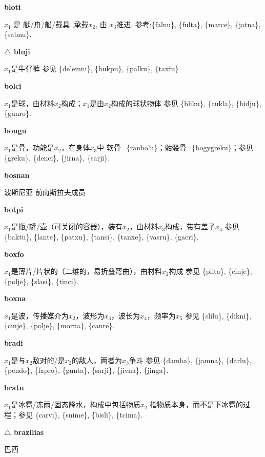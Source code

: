 \documentclass[notitlepage,twocolumn,a4paper,10pt]{book}
\begin{document}
{\sffamily\bfseries bloti}  $x_1$ 是 艇\slash{}舟\slash{}船\slash{}载具 ,承载$x_2$, 由 $x_3$推进. \textemdash{} 参考:\{falnu\}, \{fulta\}, \{marce\}, \{jatna\}, \{sabnu\}.

{\sffamily\bfseries $\triangle$ bluji} $x_1$是牛仔裤 \textemdash{} 参见 \{de'emni\}, \{bukpu\}, \{palku\}, \{taxfu\}

{\sffamily\bfseries bolci}  $x_1$是球，由材料$x_2$构成；$x_1$是由$x_2$构成的球状物体 \textemdash{} 参见 \{bliku\}, \{cukla\}, \{bidju\}, \{gunro\}.

{\sffamily\bfseries bongu}\enspace {\ttfamily\bfseries[bog     bo'u]}  $x_1$是骨，功能是$x_2$，在身体$x_3$中 \textemdash{} 软骨=\{ranbo'u\}；骷髅骨=\{bogygreku\}；参见\{greku\}, \{denci\}, \{jirna\}, \{sarji\}.

{\sffamily\bfseries bosnan} 波斯尼亚 \textemdash{} 前南斯拉夫成员

{\sffamily\bfseries botpi}\enspace {\ttfamily\bfseries[bot     bo'i]}  $x_1$是瓶\slash{}罐\slash{}壶（可关闭的容器），装有$x_2$，由材料$x_3$构成，带有盖子$x_4$ \textemdash{} 参见 \{baktu\}, \{lante\}, \{patxu\}, \{tansi\}, \{tanxe\}, \{vasru\}, \{gacri\}.

{\sffamily\bfseries boxfo}\enspace {\ttfamily\bfseries[bof     bo'o]}  $x_1$是薄片\slash{}片状的（二维的，易折叠弯曲），由材料$x_2$构成 \textemdash{} 参见 \{plita\}, \{cinje\}, \{polje\}, \{slasi\}, \{tinci\}.

{\sffamily\bfseries boxna}\enspace {\ttfamily\bfseries[bon     bo'a]}  $x_1$是波，传播媒介为$x_2$，波形为$x_3$，波长为$x_4$，频率为$x_5$ \textemdash{} 参见 \{slilu\}, \{dikni\}, \{cinje\}, \{polje\}, \{morna\}, \{canre\}.

{\sffamily\bfseries bradi} $x_1$是与$x_2$敌对的\slash{}是$x_2$的敌人，两者为$x_3$争斗 \textemdash{} 参见 \{damba\}, \{jamna\}, \{darlu\}, \{pendo\}, \{fapro\}, \{gunta\}, \{sarji\}, \{jivna\}, \{jinga\}.

{\sffamily\bfseries bratu} $x_1$是冰雹\slash{}冻雨\slash{}固态降水，构成中包括物质$x_2$ \textemdash{} 指物质本身，而不是下冰雹的过程；参见 \{carvi\}, \{snime\}, \{bisli\}, \{tcima\}.

{\sffamily\bfseries $\triangle$ brazilias} 巴西
\end{document}
